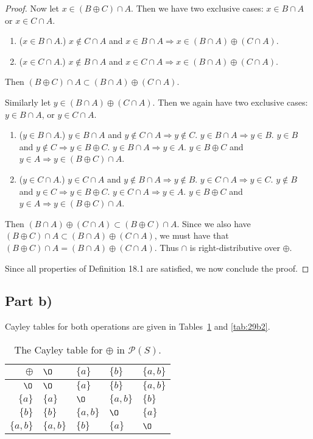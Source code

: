 \documentclass{abrice}
\renewcommand{\P}{\mathscr{P}}
\begin{document}
\begin{proof}
  Now let $x \in (B \oplus C) \cap A$. Then we have two exclusive cases: $x \in
  B \cap A$ or $x \in C \cap A$.
  \begin{enumerate}[label=\emph{\roman*})]
  \item ($x \in B \cap A$.) $x \notin C \cap A$ and $x \in B \cap A \Rightarrow
    x \in (B \cap A) \oplus (C \cap A)$.
  \item ($x \in C \cap A$.) $x \notin B \cap A$ and $x \in C \cap A \Rightarrow
    x \in (B \cap A) \oplus (C \cap A)$.
  \end{enumerate}
  Then $(B \oplus C) \cap A \subset (B \cap A) \oplus (C \cap A)$.

  Similarly let $y \in (B \cap A) \oplus (C \cap A)$. Then we again have two
  exclusive cases: $y \in B \cap A$, or $y \in C \cap A$.
  \begin{enumerate}[label=\emph{\roman*})]
  \item ($y \in B \cap A$.) $y \in B \cap A$ and $y \notin C \cap A \Rightarrow
    y \notin C$. $y \in B \cap A \Rightarrow y \in B$. $y \in B$ and $y \notin C
    \Rightarrow y \in B \oplus C$. $y \in B \cap A \Rightarrow y \in A$. $y \in
    B \oplus C$ and $y \in A \Rightarrow y \in (B \oplus C) \cap A$.
  \item ($y \in C \cap A$.) $y \in C \cap A$ and $y \notin B \cap A \Rightarrow
    y \notin B$. $y \in C \cap A \Rightarrow y \in C$. $y \notin B$ and $y \in C
    \Rightarrow y \in B \oplus C$. $y \in C \cap A \Rightarrow y \in A$. $y \in
    B \oplus C$ and $y \in A \Rightarrow y \in (B \oplus C) \cap A$.
  \end{enumerate}
  Then $(B \cap A) \oplus (C \cap A) \subset (B \oplus C) \cap A$. Since we also
  have $(B \oplus C) \cap A \subset (B \cap A) \oplus (C \cap A)$, we must have
  that $(B \oplus C) \cap A = (B \cap A) \oplus (C \cap A)$. Thus $\cap$ is
  right-distributive over $\oplus$.

  Since all properties of Definition 18.1 are satisfied, we now conclude the proof.
\end{proof}

\subsection{Part b)}

Cayley tables for both operations are given in Tables~\ref{tab:29b1} and \ref{tab:29b2}.

\begin{table}
  \centering
  \begin{tabular}{r|llll}
    $\oplus$ & $\O$ & $\{a\}$ & $\{b\}$ & $\{a,b\}$ \\
    \midrule
    $\O$ & $\O$ & $\{a\}$ & $\{b\}$ & $\{a,b\}$ \\
    $\{a\}$ & $\{a\}$ & $\O$ & $\{a,b\}$ & $\{b\}$ \\
    $\{b\}$ & $\{b\}$ & $\{a,b\}$ & $\O$ & $\{a\}$ \\
    $\{a,b\}$ & $\{a,b\}$ & $\{b\}$ & $\{a\}$ & $\O$
  \end{tabular}
  \caption{The Cayley table for $\oplus$ in $\P(S)$.}
  \label{tab:29b1}
\end{table}
\end{document}
